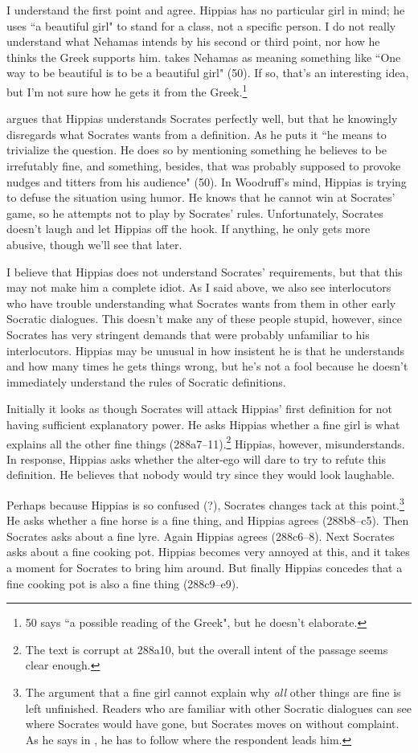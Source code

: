 \documentclass[11pt]{article}
\begin{document}
I understand the first point and agree.  Hippias has no particular girl in
mind; he uses ``a beautiful girl" to stand for a class, not a specific person.
I do not really understand what Nehamas intends by his second or third point,
nor how he thinks the Greek supports him.  \citet{woodruff1982} takes Nehamas
as meaning something like ``One way to be beautiful is to be a beautiful girl"
(50).  If so, that's an interesting idea, but I'm not sure how he gets it from
the Greek.\footnote{\citet{woodruff1982} 50 says ``a possible reading of the
Greek", but he doesn't elaborate.}

\citet{woodruff1982} argues that Hippias understands Socrates perfectly well,
but that he knowingly disregards what Socrates wants from a definition.  As he
puts it ``he means to trivialize the question.  He does so by mentioning
something he believes to be irrefutably fine, and something, besides, that was
probably supposed to provoke nudges and titters from his audience" (50).  In
Woodruff's mind, Hippias is trying to defuse the situation using humor.  He
knows that he cannot win at Socrates' game, so he attempts not to play by
Socrates' rules.  Unfortunately, Socrates doesn't laugh and let Hippias off the
hook.  If anything, he only gets more abusive, though we'll see that later.

I believe that Hippias does not understand Socrates' requirements, but that
this may not make him a complete idiot.  As I said above, we also see
interlocutors who have trouble understanding what Socrates wants from them in
other early Socratic dialogues.  This doesn't make any of these people stupid,
however, since Socrates has very stringent demands that were probably
unfamiliar to his interlocutors.  Hippias may be unusual in how insistent he is
that he understands and how many times he gets things wrong, but he's not
a fool because he doesn't immediately understand the rules of Socratic
definitions.

Initially it looks as though Socrates will attack Hippias' first definition for
not having sufficient explanatory power.  He asks Hippias whether a fine girl
is what explains all the other fine things (288a7--11).\footnote{The text is
corrupt at 288a10, but the overall intent of the passage seems clear enough.}
Hippias, however, misunderstands.  In response, Hippias asks whether the
alter-ego will dare to try to refute this definition.  He believes that nobody
would try since they would look laughable.

Perhaps because Hippias is so confused (?), Socrates changes tack at this
point.\footnote{The argument that a fine girl cannot explain why \emph{all}
other things are fine is left unfinished.  Readers who are familiar with other
Socratic dialogues can see where Socrates would have gone, but Socrates moves
on without complaint.  As he says in , he has to follow where
the respondent leads him.}  He asks whether a fine horse is a fine thing, and
Hippias agrees (288b8--c5).  Then Socrates asks about a fine lyre. Again
Hippias agrees (288c6--8).  Next Socrates asks about a fine cooking pot.
Hippias becomes very annoyed at this, and it takes a moment for Socrates to
bring him around.  But finally Hippias concedes that a fine cooking pot is also
a fine thing (288c9--e9).
\end{document}
